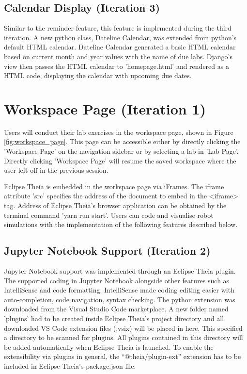 \documentclass{l4proj}
\begin{document}
\subsection{Calendar Display (Iteration 3)}

Similar to the reminder feature, this feature is implemented during the third iteration. A new python class, Dateline Calendar, was extended from python's default HTML calendar. Dateline Calendar generated a basic HTML calendar based on current month and year values with the name of  due labs. Django's view then passes the HTML calendar to 'homepage.html' and rendered as a HTML code, displaying the calendar with upcoming due dates.

\section{Workspace Page (Iteration 1)}

Users will conduct their lab exercises in the workspace page, shown in Figure \ref{fig:workspace_page}. This page can be accessible either by directly clicking the 'Workspace Page' on the navigation sidebar or by selecting a lab in 'Lab Page'. Directly clicking 'Workspace Page' will resume the saved workspace where the user left off in the previous session. 

Eclipse Theia is embedded in the workspace page via iFrames. The iframe attribute 'src' specifies the address of the document to embed in the <iframe> tag. Address of Eclipse Theia's browser application can be obtained by the terminal command 'yarn run start'. Users can code and visualise robot simulations with the implementation of the following features described below. 


\subsection{Jupyter Notebook Support (Iteration 2)}

Jupyter Notebook support was implemented through an Eclipse Theia plugin. The \cite{pythonextension} supported coding in Jupyter Notebook alongside other features such as IntelliSense and code formatting. IntelliSense made coding editing easier with auto-completion, code navigation, syntax checking. The python extension was downloaded from the Visual Studio Code marketplace. A new folder named 'plugins' had to be created inside Eclipse Theia's project directory and all downloaded VS Code extension files (.vsix) will be placed in here. This specified a directory to be scanned for plugins. All plugins contained in this directory will be added automatically when Eclipse Theia is launched. To enable the extensibility via plugins in general, the “@theia/plugin-ext” extension has to be included in Eclipse Theia's package.json file.
\end{document}
